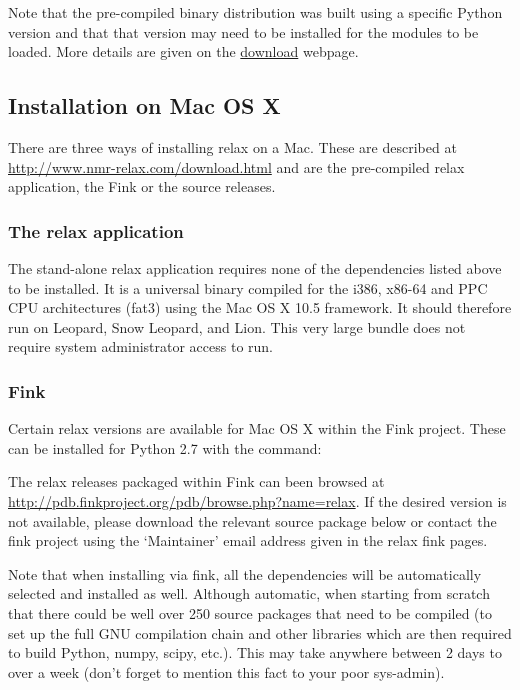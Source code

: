 

Note that the pre-compiled binary distribution was built using a specific Python version and that that version may need to be installed for the modules to be loaded.  More details are given on the \href{http://www.nmr-relax.com/download.html}{download} webpage.


\subsection{Installation on Mac OS X}

There are three ways of installing relax on a Mac.  These are described at \href{http://www.nmr-relax.com/download.html}{http://www.nmr-relax.com/download.html} and are the pre-compiled relax application, the Fink or the source releases.

\subsubsection{The relax application}

The stand-alone relax application requires none of the dependencies listed above to be installed.  It is a universal binary compiled for the i386, x86-64 and PPC CPU architectures (fat3) using the Mac OS X 10.5 framework.  It should therefore run on Leopard, Snow Leopard, and Lion.  This very large bundle does not require system administrator access to run.

\subsubsection{Fink}

Certain relax versions are available for Mac OS X within the Fink project.  These can be installed for Python 2.7 with the command:


The relax releases packaged within Fink can been browsed at \href{http://pdb.finkproject.org/pdb/browse.php?name=relax}{http://pdb.finkproject.org/pdb/browse.php?name=relax}. If the desired version is not available, please download the relevant source package below or contact the fink project using the `Maintainer' email address given in the relax fink pages.

Note that when installing via fink, all the dependencies will be automatically selected and installed as well.  Although automatic, when starting from scratch that there could be well over 250 source packages that need to be compiled (to set up the full GNU compilation chain and other libraries which are then required to build Python, numpy, scipy, etc.).  This may take anywhere between 2 days to over a week (don't forget to mention this fact to your poor sys-admin).

